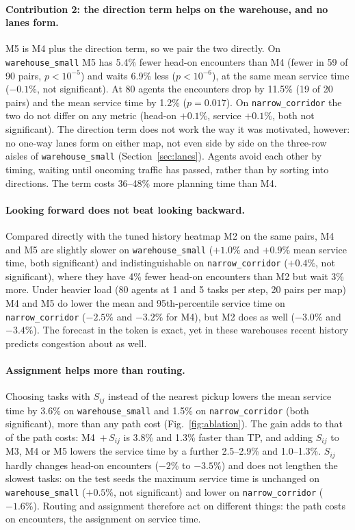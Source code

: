 \paragraph{Contribution 2: the direction term helps on the warehouse, and no lanes form.}
M5 is M4 plus the direction term, so we pair the two directly. On
\texttt{warehouse\_small} M5 has 5.4\% fewer head-on encounters than M4 (fewer
in 59 of 90 pairs, $p<10^{-5}$) and waits 6.9\% less ($p<10^{-6}$), at the same
mean service time ($-0.1\%$, not significant). At 80 agents the encounters drop
by 11.5\% (19 of 20 pairs) and the mean service time by 1.2\% ($p=0.017$). On
\texttt{narrow\_corridor} the two do not differ on any metric (head-on
$+0.1\%$, service $+0.1\%$, both not significant). The direction term does not
work the way it was motivated, however: no one-way lanes form on either map,
not even side by side on the three-row aisles of \texttt{warehouse\_small}
(Section~\ref{sec:lanes}). Agents avoid each other by timing, waiting until
oncoming traffic has passed, rather than by sorting into directions. The term
costs 36--48\% more planning time than M4.

\paragraph{Looking forward does not beat looking backward.}
Compared directly with the tuned history heatmap M2 on the same pairs, M4 and
M5 are slightly slower on \texttt{warehouse\_small} ($+1.0\%$ and $+0.9\%$
mean service time, both significant) and indistinguishable on
\texttt{narrow\_corridor} ($+0.4\%$, not significant), where they have 4\%
fewer head-on encounters than M2 but wait 3\% more. Under heavier load (80
agents at 1 and 5 tasks per step, 20 pairs per map) M4 and M5 do lower the mean
and 95th-percentile service time on \texttt{narrow\_corridor} ($-2.5\%$ and
$-3.2\%$ for M4), but M2 does as well ($-3.0\%$ and $-3.4\%$). The forecast in
the token is exact, yet in these warehouses recent history predicts congestion
about as well.

\paragraph{Assignment helps more than routing.}
Choosing tasks with $S_{ij}$ instead of the nearest pickup lowers the mean
service time by 3.6\% on \texttt{warehouse\_small} and 1.5\% on
\texttt{narrow\_corridor} (both significant), more than any path cost
(Fig.~\ref{fig:ablation}). The gain adds to that of the path costs: M4~$+\,S_{ij}$
is 3.8\% and 1.3\% faster than TP, and adding $S_{ij}$ to M3, M4 or M5 lowers
the service time by a further 2.5--2.9\% and 1.0--1.3\%. $S_{ij}$ hardly
changes head-on encounters ($-2$\% to $-3.5\%$) and does not lengthen the
slowest tasks: on the test seeds the maximum service time is unchanged on
\texttt{warehouse\_small} ($+0.5\%$, not significant) and lower on
\texttt{narrow\_corridor} ($-1.6\%$). Routing and assignment therefore act on
different things: the path costs on encounters, the assignment on service
time.

